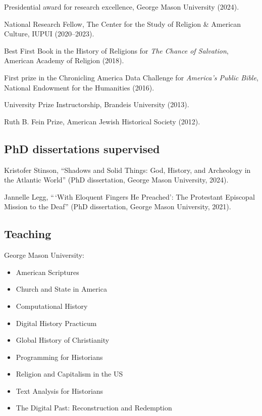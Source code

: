 \documentclass[11pt]{article}
\providecommand{\tightlist}{%
  \setlength{\itemsep}{0pt}\setlength{\parskip}{0pt}}
\begin{document}
Presidential award for research excellence, George Mason University (2024).

National Research Fellow, The Center for the Study of Religion \& American 
Culture, IUPUI (2020--2023).

Best First Book in the History of Religions for \emph{The Chance of Salvation}, American Academy of Religion (2018).

First prize in the Chronicling America Data Challenge for \emph{America's Public Bible}, National Endowment for the Humanities (2016).

University Prize Instructorship, Brandeis University (2013).

Ruth B. Fein Prize, American Jewish Historical Society (2012). 

\subsection{PhD dissertations supervised}\label{Dissertations supervised}

Kristofer Stinson, ``Shadows and Solid Things: God, History, and Archeology in 
the Atlantic World'' (PhD dissertation, George Mason University, 2024).

Jannelle Legg, ``\,`With Eloquent Fingers He Preached': The Protestant Episcopal Mission to the Deaf'' (PhD dissertation, George Mason University, 2021).

\subsection{Teaching}\label{Teaching}

George Mason University:

\vspace{-0.15in}

\begin{itemize}
    \tightlist
  \item American Scriptures 
  \item Church and State in America
  \item Computational History 
  \item Digital History Practicum
  \item Global History of Christianity 
  \item Programming for Historians 
  \item Religion and Capitalism in the US 
  \item Text Analysis for Historians 
  \item The Digital Past: Reconstruction and Redemption
\end{itemize}
\end{document}
